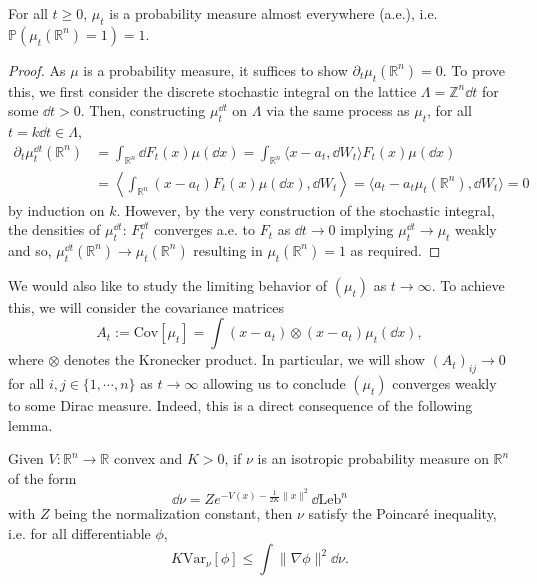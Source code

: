 \begin{proposition}
  For all \(t \ge 0\), \(\mu_t\) is a probability measure almost everywhere (a.e.), i.e. \(\mathbb{P}(\mu_t(\mathbb{R}^n) = 1) = 1\).
\end{proposition}
\begin{proof}
  As \(\mu\) is a probability measure, it suffices to show \(\partial_t \mu_t(\mathbb{R}^n) = 0\).
  To prove this, we first consider the discrete stochastic integral on the lattice \(\Lambda = \mathbb{Z}^n \dd t\)
  for some \(\dd t > 0\). Then, constructing \(\mu_t^{\dd t}\) on \(\Lambda\) via the same process as \(\mu_t\),
  for all \(t = k \dd t \in \Lambda\),
  \begin{align*}
    \partial_t \mu_t^{\dd t}(\mathbb{R}^n) 
      & = \int_{\mathbb{R}^n} \dd F_t(x) \mu(\dd x) 
        = \int_{\mathbb{R}^n} \langle x - a_t, \dd W_t\rangle F_t(x) \mu(\dd x)\\
      & = \left\langle \int_{\mathbb{R}^n} (x - a_t) F_t(x)\mu(\dd x), \dd W_t \right\rangle
        = \langle a_t - a_t\mu_t(\mathbb{R}^n), \dd W_t \rangle = 0
  \end{align*}
  by induction on \(k\). However, by the very construction of the stochastic integral, the densities 
  of \(\mu_t^{\dd t}\): \(F_t^{\dd t}\) converges a.e. to \(F_t\) as \(\dd t \to 0\) implying 
  \(\mu_t^{\dd t} \to \mu_t\) weakly and so, \(\mu_t^{\dd t}(\mathbb{R}^n) \to \mu_t(\mathbb{R}^n)\)
  resulting in \(\mu_t(\mathbb{R}^n) = 1\) as required.
\end{proof}

We would also like to study the limiting behavior of \((\mu_t)\) as \(t \to \infty\). To achieve this, 
we will consider the covariance matrices
\begin{equation}
  A_t := \text{Cov}[\mu_t] = \int (x - a_t) \otimes (x - a_t) \mu_t(\dd x),
\end{equation}
where \(\otimes\) denotes the Kronecker product. In particular, we will show \((A_t)_{ij} \to 0\) for all
 \(i, j \in \{1, \cdots, n\}\) as \(t \to \infty\) allowing us to conclude \((\mu_t)\) converges weakly 
 to some Dirac measure. Indeed, this is a direct consequence of the following lemma.

\begin{lemma}\label{lem:brascamp-lieb}
  Given \(V : \mathbb{R}^n \to \mathbb{R}\) convex and \(K > 0\), if \(\nu\) is an isotropic probability 
  measure on \(\mathbb{R}^n\) of the form 
  \[\dd \nu = Ze^{-V(x) - \frac{1}{2K}\|x\|^2}\dd \text{Leb}^n\]
  with \(Z\) being the normalization constant, then \(\nu\) satisfy the Poincaré inequality, i.e. 
  for all differentiable \(\phi\),
  \[K\text{Var}_\nu[\phi] \le \int \|\nabla\phi\|^2 \dd\nu.\]
\end{lemma}

